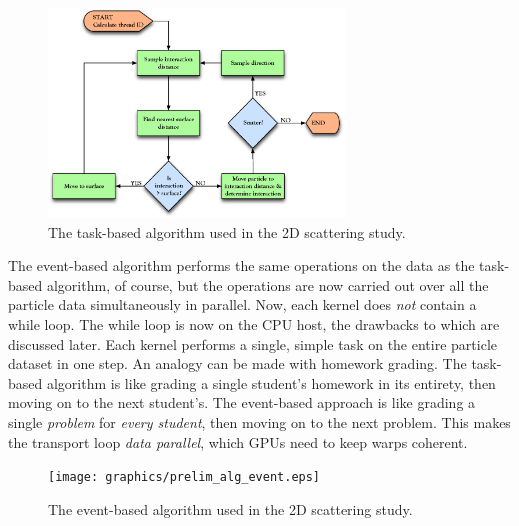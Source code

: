 \begin{figure}[h!] 
  \centering
    \includegraphics[width=0.7\textwidth]{graphics/prelim_alg_task.eps}
     \caption{The task-based algorithm used in the 2D scattering study. \label{prelim_alg_task} }
\end{figure}

The event-based algorithm performs the same operations on the data as the task-based algorithm, of course, but the operations are now carried out over all the particle data simultaneously in parallel.  Now, each kernel does \emph{not} contain a while loop.  The while loop is now on the CPU host, the drawbacks to which are discussed later.  Each kernel performs a single, simple task on the entire particle dataset in one step.  An analogy can be made with homework grading.  The task-based algorithm is like grading a single student's homework in its entirety, then moving on to the next student's.  The event-based approach is like grading a single \emph{problem} for \emph{every student}, then moving on to the next problem.  This makes the transport loop \emph{data parallel}, which GPUs need to keep warps coherent. 

\begin{figure}[h!] 
  \centering
    \texttt{[image: graphics/prelim\_alg\_event.eps]}
     \caption{The event-based algorithm used in the 2D scattering study. \label{prelim_alg_event} }
\end{figure}

